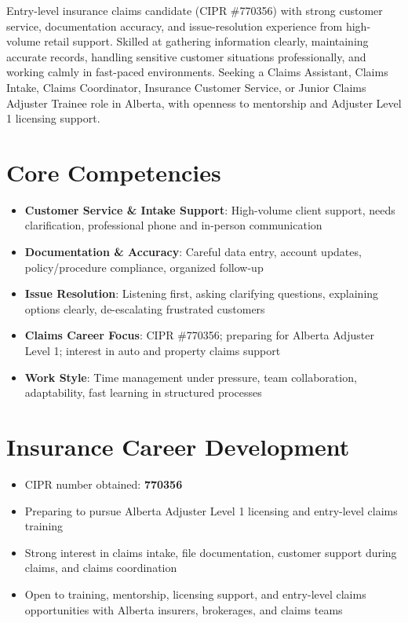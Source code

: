 \documentclass[11pt,a4paper,sans]{moderncv}
\begin{document}
\makecvtitle

\vspace{6pt}
\small{Entry-level insurance claims candidate (CIPR \#770356) with strong customer service, documentation accuracy, and issue-resolution experience from high-volume retail support. Skilled at gathering information clearly, maintaining accurate records, handling sensitive customer situations professionally, and working calmly in fast-paced environments. Seeking a Claims Assistant, Claims Intake, Claims Coordinator, Insurance Customer Service, or Junior Claims Adjuster Trainee role in Alberta, with openness to mentorship and Adjuster Level 1 licensing support.}

\section{Core Competencies}
\vspace{1pt}
\begin{itemize}
\item \textbf{Customer Service \& Intake Support}: High-volume client support, needs clarification, professional phone and in-person communication
\item \textbf{Documentation \& Accuracy}: Careful data entry, account updates, policy/procedure compliance, organized follow-up
\item \textbf{Issue Resolution}: Listening first, asking clarifying questions, explaining options clearly, de-escalating frustrated customers
\item \textbf{Claims Career Focus}: CIPR \#770356; preparing for Alberta Adjuster Level 1; interest in auto and property claims support
\item \textbf{Work Style}: Time management under pressure, team collaboration, adaptability, fast learning in structured processes
\end{itemize}

\section{Insurance Career Development}
\vspace{1pt}
\begin{itemize}
\item CIPR number obtained: \textbf{770356}
\item Preparing to pursue Alberta Adjuster Level 1 licensing and entry-level claims training
\item Strong interest in claims intake, file documentation, customer support during claims, and claims coordination
\item Open to training, mentorship, licensing support, and entry-level claims opportunities with Alberta insurers, brokerages, and claims teams
\end{itemize}
\end{document}
